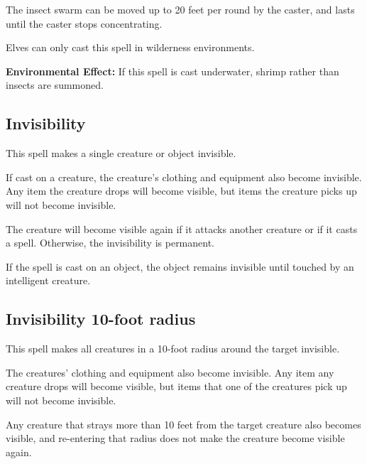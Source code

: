 \begin{multicols*}{2}
The insect swarm can be moved up to 20 feet per round by the caster, and lasts until the caster stops concentrating.

Elves can only cast this spell in wilderness environments.

\textbf{Environmental Effect:} If this spell is cast underwater, shrimp rather than insects are summoned.

\subsection{Invisibility}\label{spell:Invisibility}

This spell makes a single creature or object invisible.

If cast on a creature, the creature’s clothing and equipment also become invisible. Any item the creature drops will become visible, but items the creature picks up will not become invisible.

The creature will become visible again if it attacks another creature or if it casts a spell. Otherwise, the invisibility is permanent.

If the spell is cast on an object, the object remains invisible until touched by an intelligent creature.

\subsection{Invisibility 10-foot radius}\label{spell:Invisibility 10-foot radius}

This spell makes all creatures in a 10-foot radius around the target invisible.

The creatures’ clothing and equipment also become invisible. Any item any creature drops will become visible, but items that one of the creatures pick up will not become invisible.

Any creature that strays more than 10 feet from the target creature also becomes visible, and re-entering that radius does not make the creature become visible again.


\end{multicols*}
